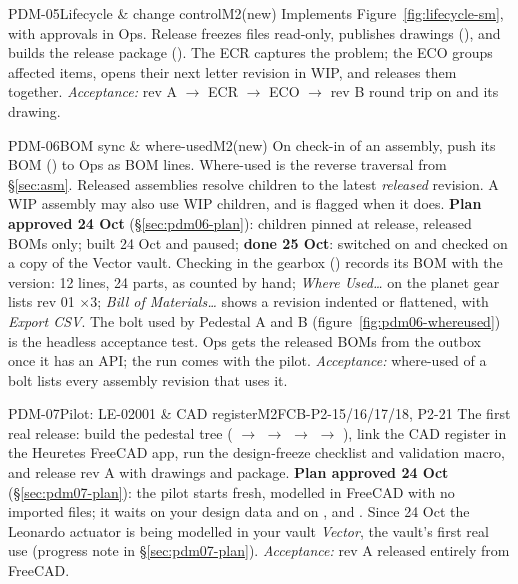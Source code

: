 \begin{epic}{PDM-05}{Lifecycle \& change control}{M2}{\stProg}{(new)}
Implements Figure~\ref{fig:lifecycle-sm}, with approvals in Ops. Release freezes files read-only, publishes
drawings (), and builds the release package (). The ECR captures the problem;
the ECO groups affected items, opens their next letter revision in WIP, and releases them together.
\emph{Acceptance:} rev A $\rightarrow$ ECR $\rightarrow$ ECO $\rightarrow$ rev B round trip on 
and its drawing.
\end{epic}

\begin{epic}{PDM-06}{BOM sync \& where-used}{M2}{\stDone}{(new)}
On check-in of an assembly, push its BOM () to Ops as BOM lines. Where-used is the reverse
traversal from \S\ref{sec:asm}. Released assemblies resolve children to the latest \emph{released}
revision. A WIP assembly may also use WIP children, and is flagged when it does.
\textbf{Plan approved 24 Oct} (\S\ref{sec:pdm06-plan}): children pinned at release, released BOMs only;
built 24 Oct and paused; \textbf{done 25 Oct}: switched on and checked on a copy of the Vector vault. Checking in the
gearbox () records its BOM with the version: 12 lines, 24 parts, as counted by hand; \emph{Where
Used\ldots} on the planet gear lists  rev 01 $\times3$; \emph{Bill of Materials\ldots} shows a revision
indented or flattened, with \emph{Export CSV}. The bolt used by Pedestal A and B
(figure~\ref{fig:pdm06-whereused}) is the headless acceptance test. Ops gets the released BOMs from the outbox once
it has an API; the  run comes with the  pilot.
\emph{Acceptance:} where-used of a bolt lists every assembly revision that uses it.
\end{epic}

\begin{epic}{PDM-07}{Pilot: LE-02001 \& CAD register}{M2}{\stTodo}{FCB-P2-15/16/17/18, P2-21}
The first real release: build the pedestal tree ( $\rightarrow$ 
$\rightarrow$  $\rightarrow$  $\rightarrow$ ), link the CAD
register in the Heuretes FreeCAD app, run the design-freeze checklist and validation macro, and release rev A with
drawings and package.
\textbf{Plan approved 24 Oct} (\S\ref{sec:pdm07-plan}): the pilot starts fresh, modelled in FreeCAD with no imported
files; it waits on your design data and on ,  and . Since 24 Oct the
Leonardo actuator is being modelled in your vault \emph{Vector}, the vault's first real use (progress note in
\S\ref{sec:pdm07-plan}).
\emph{Acceptance:}  rev A released entirely from FreeCAD.
\end{epic}

